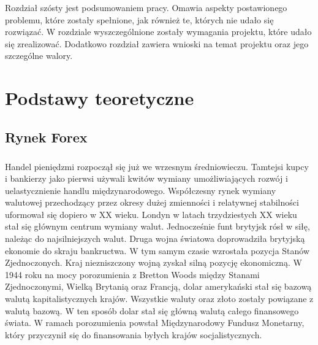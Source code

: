 \documentclass[pdflatex,11pt]{aghdpl}
\begin{document}
Rozdział szósty jest podsumowaniem pracy. Omawia aspekty postawionego problemu, które zostały spełnione, jak również te, których nie udało się rozwiązać. W rozdziale wyszczególnione zostały wymagania projektu, które udało się zrealizować. Dodatkowo rozdział zawiera wnioski na temat projektu oraz jego szczególne walory.
\chapter{Podstawy teoretyczne}
\label{chap:teoria}

\section{Rynek Forex}
\label{sec:forex}
\paragraph{}
Handel pieniędzmi rozpoczął się już we wrzesnym średniowieczu. Tamtejsi kupcy i bankierzy jako pierwsi używali kwitów wymiany umożliwiających rozwój i uelastycznienie handlu międzynarodowego. Współczesny rynek wymiany walutowej przechodzący przez okresy dużej zmienności i relatywnej stabilności uformował się dopiero w XX wieku. Londyn w latach trzydziestych XX wieku stał się głównym centrum wymiany walut. Jednocześnie funt brytyjsk rósł w siłę, należąc do najsilniejszych walut. Druga wojna światowa doprowadziła brytyjską ekonomie do skraju bankructwa. W tym samym czasie wzrostała pozycja Stanów Zjednoczonych. Kraj niezniszczony wojną zyskał silną pozycję ekonomiczną. W 1944 roku na mocy porozumienia z Bretton Woods między Stanami Zjednoczonymi, Wielką Brytanią oraz Francją, dolar amerykański stał się bazową walutą kapitalistycznych krajów. Wszystkie waluty oraz złoto zostały powiązane z walutą bazową. W ten sposób dolar stał się główną walutą całego finansowego świata. W ramach porozumienia powstał Międzynarodowy Fundusz Monetarny, który przyczynił się do finansowania byłych krajów socjalistycznych\cite{9}. 
\end{document}
